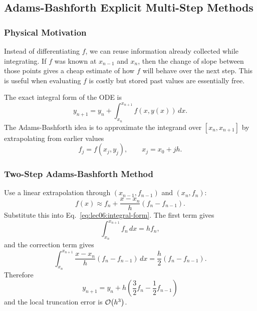 \subsection{Adams-Bashforth Explicit Multi-Step Methods}
\label{subsec:lec06:adams-bashforth}

\subsubsection*{Physical Motivation}
Instead of differentiating $f$, we can reuse information already collected
while integrating. If $f$ was known at $x_{n-1}$ and $x_n$, then the change
of slope between those points gives a cheap estimate of how $f$ will behave
over the next step. This is useful when evaluating $f$ is costly but stored
past values are essentially free.

The exact integral form of the ODE is
\begin{equation}
    y_{n+1}
    = y_n+\int_{x_n}^{x_{n+1}} f(x,y(x))\, dx.
    \label{eq:lec06:integral-form}
\end{equation}
The Adams-Bashforth idea is to approximate the integrand over
$[x_n,x_{n+1}]$ by extrapolating from earlier values
\begin{equation}
    f_j=f(x_j,y_j),
    \qquad x_j=x_0+jh.
    \label{eq:lec06:fj-definition}
\end{equation}

\subsubsection{Two-Step Adams-Bashforth Method}
Use a linear extrapolation through $(x_{n-1},f_{n-1})$ and $(x_n,f_n)$:
\begin{equation}
    f(x)\approx f_n+\frac{x-x_n}{h}\left(f_n-f_{n-1}\right).
    \label{eq:lec06:linear-extrapolation}
\end{equation}
Substitute this into Eq.~\eqref{eq:lec06:integral-form}. The first term gives
\begin{equation}
    \int_{x_n}^{x_{n+1}} f_n\, dx=h f_n,
    \label{eq:lec06:ab2-integral-first}
\end{equation}
and the correction term gives
\begin{equation}
    \int_{x_n}^{x_{n+1}}
    \frac{x-x_n}{h}\left(f_n-f_{n-1}\right)\, dx
    =\frac{h}{2}\left(f_n-f_{n-1}\right).
    \label{eq:lec06:ab2-integral-second}
\end{equation}
Therefore
\begin{equation}
    \boxed{
    y_{n+1}
    = y_n+h\left(\frac{3}{2}f_n-\frac{1}{2}f_{n-1}\right)}
    \label{eq:lec06:ab2}
\end{equation}
and the local truncation error is $\mathcal{O}\!\left(h^3\right)$.

